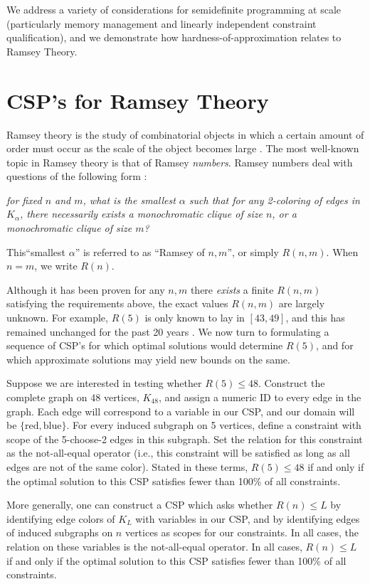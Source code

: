 \documentclass[12pt]{article} %
\begin{document}
We address a variety of considerations for semidefinite programming at scale (particularly memory management and linearly independent constraint qualification), and we demonstrate how hardness-of-approximation relates to Ramsey Theory.


\section{CSP's for Ramsey Theory}
Ramsey theory is the study of combinatorial objects in which a certain amount of order must occur as the scale of the object becomes large \cite{rt}. The most well-known topic in Ramsey theory is that of Ramsey \textit{numbers}. Ramsey numbers deal with questions of the following form : 

\vspace{1em}
\noindent \textit{for fixed $n$ and $m$, what is the smallest $\alpha$ such that for \textit{any} 2-coloring of edges in $K_\alpha$, there necessarily exists a monochromatic clique of size $n$, or a monochromatic clique of size $m$?}
\vspace{1em}

This``smallest $\alpha$'' is referred to as ``Ramsey of $n,m$'', or simply $R(n,m)$. When $n = m$, we write $R(n)$.

Although it has been proven for any $n,m$ there \textit{exists} a finite $R(n,m)$ satisfying the requirements above, the exact values $R(n,m)$ are largely unknown. For example, $R(5)$ is only known to lay in $[43,49]$, and this has remained unchanged for the past 20 years \cite{rn}. We now turn to formulating a sequence of CSP's for which optimal solutions would determine $R(5)$, and for which approximate solutions may yield new bounds on the same.

Suppose we are interested in testing whether $R(5) \leq 48$. Construct the complete graph on 48 vertices, $K_{48}$, and assign a numeric ID to every edge in the graph. Each edge will correspond to a variable in our CSP, and our domain will be $\{\text{red},\text{blue}\}$. For every induced subgraph on 5 vertices, define a constraint with scope of the 5-choose-2 edges in this subgraph. Set the relation for this constraint as the not-all-equal operator (i.e., this constraint will be satisfied as long as all edges are not of the same color). Stated in these terms, $R(5) \leq 48$ if and only if the optimal solution to this CSP satisfies fewer than 100\% of all constraints.

More generally, one can construct a CSP which asks whether $R(n) \leq L$ by identifying edge colors of $K_L$ with variables in our CSP, and by identifying edges of induced subgraphs on $n$ vertices as scopes for our constraints. In all cases, the relation on these variables is the not-all-equal operator. In all cases, $R(n) \leq L$ if and only if the optimal solution to this CSP satisfies fewer than 100\% of all constraints.
\end{document}
